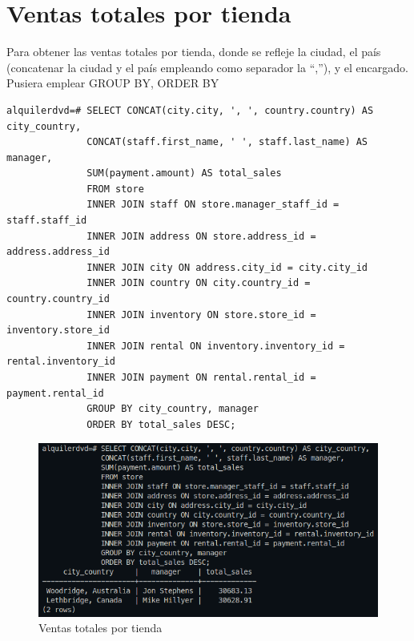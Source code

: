 \documentclass{report}
\begin{document}
\cleardoublepage

\section{Ventas totales por tienda}
Para obtener las ventas totales por tienda, donde se refleje la ciudad, el país
(concatenar la ciudad y el país empleando como separador la “,”), y el
encargado. Pusiera emplear GROUP BY, ORDER BY
\begin{verbatim}
alquilerdvd=# SELECT CONCAT(city.city, ', ', country.country) AS city_country,
              CONCAT(staff.first_name, ' ', staff.last_name) AS manager,
              SUM(payment.amount) AS total_sales
              FROM store
              INNER JOIN staff ON store.manager_staff_id = staff.staff_id
              INNER JOIN address ON store.address_id = address.address_id
              INNER JOIN city ON address.city_id = city.city_id
              INNER JOIN country ON city.country_id = country.country_id
              INNER JOIN inventory ON store.store_id = inventory.store_id
              INNER JOIN rental ON inventory.inventory_id = rental.inventory_id
              INNER JOIN payment ON rental.rental_id = payment.rental_id
              GROUP BY city_country, manager
              ORDER BY total_sales DESC;
\end{verbatim}
\begin{figure}[H]
  \centering
  \includegraphics[scale=0.60]{img/querie_b.png}
  \caption{Ventas totales por tienda}
  \label{fig:ventas totales por tienda}
\end{figure}

\cleardoublepage

\end{document}

